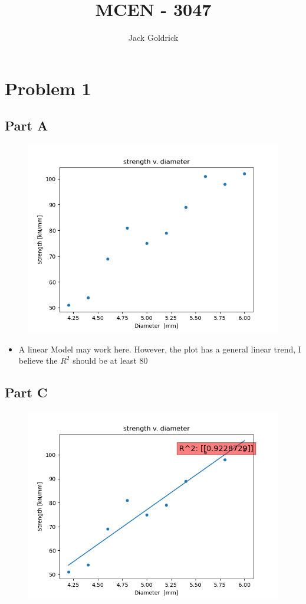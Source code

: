 \documentclass[]{report}
\title{MCEN - 3047}
\author{Jack Goldrick}
\begin{document}
	\maketitle
	
	\section{Problem 1}
	
	\subsection{Part A}
	
\begin{figure}[h]
	\centering
	\includegraphics[width=0.7\linewidth]{pics/1a}
	\label{fig:1a}
\end{figure}


\begin{itemize}
	\item A linear Model may work here. However, the plot has a general linear trend, I believe the $R^2$ should be at least 80
\end{itemize}
	
	\subsection{Part C}
	
	\begin{figure}[h]
		\centering
		\includegraphics[width=0.7\linewidth]{pics/1bc}
		\label{fig:1c}
	\end{figure}
	
\end{document}
